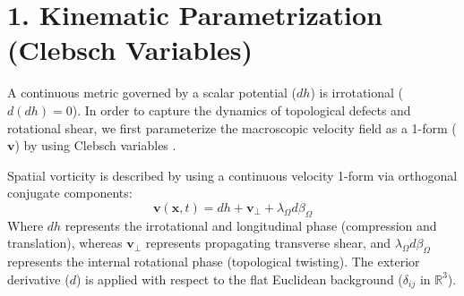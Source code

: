 \begin{abstract}
This document resumes Einstein's effort to unify gravitation and electromagnetism by generalizing the classical symmetric metric into a complete Asymmetric Metric-Tensor ($\hat{U}_{\mu\nu}$). By relaxing the assumption of an irrotational vacuum baseline, the tensor forward-models both macroscopic spacetime curvature (General Relativity) and discrete quantum kinematics (Electromagnetism and Mass) as orthogonal, coupled strain components of a continuous manifold. 

The scope of this manuscript constructs the primary tensor, computes its principal eigenvalues, and applies symmetry-breaking Lie derivatives to resolve the trace contractions of the matrix. These operations derive the four fundamental forces as boundary conditions of a single continuous pressure gradient. Beyond recovering the admittance-modified Navier-Stokes equation, the Kinematic Lagrangian and the Schwarzschild metric, the tensor extracts the cosmological constant ($\Lambda$), the physical Planck mass yield limit, the Compton cavitation boundary, anomalous galactic kinematics without dark matter, and cosmological redshift via thermodynamic metric capacity.

The capability of a single tensor to reproduce these scale invariant phenomena validates the asymmetric continuous baseline. Advanced phenomenological applications emerge as predictive corollaries. By formalizing the operational methodology of these extensions, the tensor establishes itself as a unified forward-modeling engine for continuous physics, validating Einstein's historical intuition that physical unification requires an asymmetric geometric extension. 
\end{abstract}

\vspace{0.5cm}

\section*{1. Kinematic Parametrization (Clebsch Variables)}
A continuous metric governed by a scalar potential ($dh$) is irrotational ($d(dh) = 0$). In order to capture the dynamics of topological defects and rotational shear, we first parameterize the macroscopic velocity field as a 1-form ($\mathbf{v}$) by using Clebsch variables \cite{Clebsch1859}. 

Spatial vorticity is described by using a continuous velocity 1-form via orthogonal conjugate components:
\begin{equation}
    \mathbf{v}(\mathbf{x}, t) = dh + \mathbf{v}_{\perp} + \lambda_\Omega d\beta_\Omega \label{eq:tensor_velocity_field} 
\end{equation}
Where $dh$ represents the irrotational and longitudinal phase (compression and translation), whereas $\mathbf{v}_{\perp}$ represents propagating transverse shear, and $\lambda_\Omega d\beta_\Omega$ represents the internal rotational phase (topological twisting). The exterior derivative ($d$) is applied with respect to the flat Euclidean background ($\delta_{ij}$ in $\mathbb{R}^3$). 

